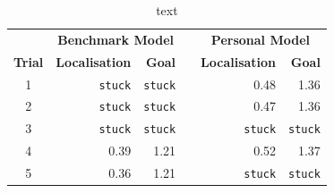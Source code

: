 \documentclass[a4paper]{article}
\begin{document}
\begin{table}[h]
\centering
\caption{text}
\begin{tabular}{crrcrr}
\toprule
& \multicolumn{2}{c}{\textbf{Benchmark Model}} & & \multicolumn{2}{c}{\textbf{Personal Model}} \\
\cline{2-3} \cline{5-6}
\textbf{Trial} & \textbf{Localisation} & \textbf{Goal} & & \textbf{Localisation} & \textbf{Goal} \\
\midrule
1 & \texttt{stuck} & \texttt{stuck} & & 0.48 & 1.36 \\
2 & \texttt{stuck} & \texttt{stuck} & & 0.47 & 1.36 \\
3 & \texttt{stuck} & \texttt{stuck} & & \texttt{stuck} & \texttt{stuck} \\
4 & 0.39 & 1.21 & & 0.52 & 1.37 \\
5 & 0.36 & 1.21 & & \texttt{stuck} & \texttt{stuck} \\
\bottomrule
\end{tabular}
\end{table}

\newpage

\begin{minipage}{0.45\textwidth}
\centering
{}
\end{minipage}
\hspace{1cm}
\begin{minipage}{0.45\textwidth}
\centering
{}
\end{minipage}
\end{document}
